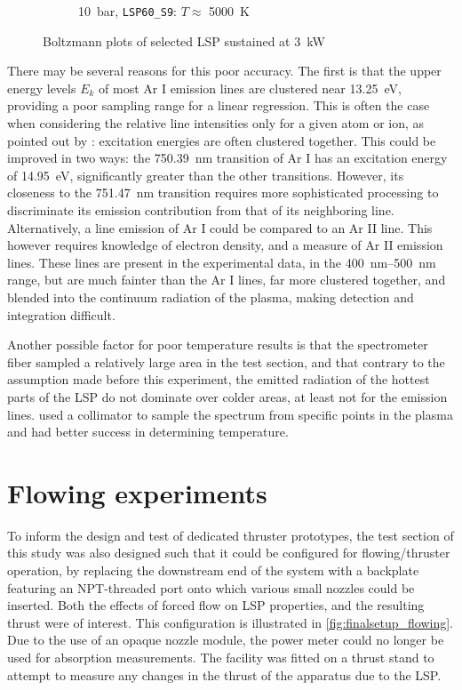 \begin{figure}[h]
\begin{subfigure}[t]{0.47\textwidth}
                    \caption{\qty{10}{bar}, \texttt{LSP60\_S9}: $T \approx$ \qty{5000}{K}}
                    \label{fig:boltzmann_LSP60_S9}
                \end{subfigure}
                \caption{Boltzmann plots of selected LSP sustained at \qty{3}{kW}}
                \label{fig:boltzmannplot}
            \end{figure}

            There may be several reasons for this poor accuracy. The first is that the upper energy levels $E_k$ of most Ar I emission lines are clustered near \qty{13.25}{eV}, providing a poor sampling range for a linear regression. This is often the case when considering the relative line intensities only for a given atom or ion, as pointed out by \textcite{griemSpectroscopicTemperatureMeasurements1997}: excitation energies are often clustered together. This could be improved in two ways: the \qty{750.39}{nm} transition of Ar I has an excitation energy of \qty{14.95}{eV}, significantly greater than the other transitions. However, its closeness to the \qty{751.47}{nm} transition requires more sophisticated processing to discriminate its emission contribution from that of its neighboring line. Alternatively, a line emission of Ar I could be compared to an Ar II line. This however requires knowledge of electron density, and a measure of Ar II emission lines. These lines are present in the experimental data, in the \qtyrange{400}{500}{nm} range, but are much fainter than the Ar I lines, far more clustered together, and blended into the continuum radiation of the plasma, making detection and integration difficult.

            Another possible factor for poor temperature results is that the spectrometer fiber sampled a relatively large area in the test section, and that contrary to the assumption made before this experiment, the emitted radiation of the hottest parts of the LSP do not dominate over colder areas, at least not for the emission lines.  \textcite{nassarInvestigationLasersustainedPlasma2012} used a collimator to sample the spectrum from specific points in the plasma and had better success in determining temperature. 
    
    \section{Flowing experiments}
        To inform the design and test of dedicated thruster prototypes, the test section of this study was also designed such that it could be configured for flowing/thruster operation, by replacing the downstream end of the system with a backplate featuring an NPT-threaded port onto which various small nozzles could be inserted. Both the effects of forced flow on LSP properties, and the resulting thrust were of interest. This configuration is illustrated in \autoref{fig:finalsetup_flowing}. Due to the use of an opaque nozzle module, the power meter could no longer be used for absorption measurements. The facility was fitted on a thrust stand to attempt to measure any changes in the thrust of the apparatus due to the LSP.

